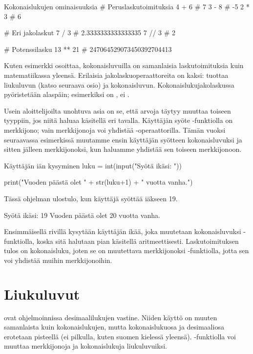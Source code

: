 \begin{example}{Kokonaislukujen ominaisuuksia}
# Peruslaskutoimituksia
4 + 6 # 7
3 - 8 # -5
2 * 3 # 6

# Eri jakolaskut
7 / 3 # 2.3333333333333335
7 // 3 # 2

# Potenssilasku
13 ** 21 # 247064529073450392704413
\end{example}

Kuten esimerkki osoittaa, kokonaisluvuilla on samanlaisia laskutoimituksia kuin matematiikassa yleensä. Erilaisia jakolaskuoperaattoreita on kaksi: \code{/} tuottaa liukuluvun (katso seuraava osio) ja \code{//} kokonaisluvun. Kokonaislukujakolaskussa pyöristetään alaspäin; esimerkiksi  on , ei .

Usein aloittelijoilta unohtuva asia on se, että arvoja täytyy muuttaa toiseen tyyppiin, jos niitä haluaa käsitellä eri tavalla. Käyttäjän syöte -funktiolla on merkkijono; vain merkkijonoja voi yhdistää \code{+}-operaattorilla. Tämän vuoksi seuraavassa esimerkissä muutamme ensin käyttäjän syötteen kokonaisluvuksi ja sitten jälleen merkkijonoksi, kun haluamme yhdistää sen toiseen merkkijonoon.

\begin{example}{Käyttäjän iän kysyminen}
luku = int(input("Syötä ikäsi: "))

print("Vuoden päästä olet " + str(luku+1) + " vuotta vanha.")
\end{example}

Tässä ohjelman ulostulo, kun käyttäjä syöttää iäkseen 19.

\begin{output}
Syötä ikäsi: 19
Vuoden päästä olet 20 vuotta vanha.
\end{output}

Ensimmäisellä rivillä kysytään käyttäjän ikää, joka muutetaan kokonaisluvuksi -funktiolla, koska sitä halutaan pian käsitellä aritmeettisesti. Laskutoimituksen  tulos on kokonaisluku, joten se on muutettava merkkijonoksi -funktiolla, jotta sen voi yhdistää muihin merkkijonoihin.

\section{Liukuluvut}

 ovat ohjelmoinnissa desimaalilukujen vastine. Niiden käyttö on muuten samanlaista kuin kokonaislukujen, mutta kokonaislukuosa ja desimaaliosa erotetaan pisteellä (ei pilkulla, kuten suomen kielessä yleensä). -funktiolla voi muuttaa merkkijonoja ja kokonaislukuja liukuluvuiksi.

